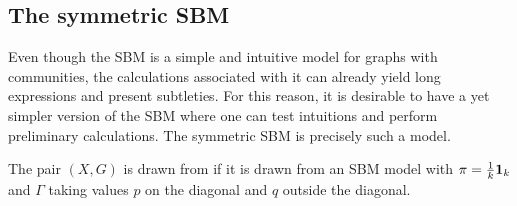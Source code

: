 \documentclass[../../main.tex]{subfiles} %
\begin{document}
\subsection{The symmetric SBM}
Even though the SBM is a simple and intuitive model for graphs with 
communities, the calculations associated with it can already yield long 
expressions and present subtleties. For this reason, it is desirable to 
have a yet simpler version of the SBM where one can test intuitions and perform 
preliminary calculations. The symmetric SBM is precisely such a model. 
\begin{definition}
	The pair \((X, G)\) is drawn from  if it is drawn from an 
	SBM model with \(\pi = \frac{1}{k} \ones[k]\) and \(\Gamma\) taking values 
	\(p\) on the diagonal and \(q\) outside the diagonal.
\end{definition}
\end{document}
